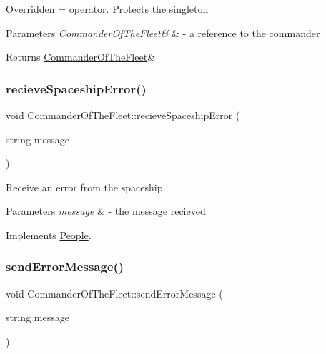 Overridden = operator. Protects the singleton 
\begin{DoxyParams}{Parameters}
{\em Commander\+Of\+The\+Fleet\&} & -\/ a reference to the commander \\
\hline
\end{DoxyParams}
\begin{DoxyReturn}{Returns}
\hyperlink{classCommanderOfTheFleet}{Commander\+Of\+The\+Fleet}\& 
\end{DoxyReturn}
\mbox{\label{classCommanderOfTheFleet_a13e91b9342df067b375f7ef2b929c0d5}} 
\subsubsection{\texorpdfstring{recieve\+Spaceship\+Error()}{recieveSpaceshipError()}}
{\footnotesize\ttfamily void Commander\+Of\+The\+Fleet\+::recieve\+Spaceship\+Error (\begin{DoxyParamCaption}\item[{string}]{message }\end{DoxyParamCaption})\hspace{0.3cm}{\ttfamily [virtual]}}

Receive an error from the spaceship 
\begin{DoxyParams}{Parameters}
{\em message} & -\/ the message recieved \\
\hline
\end{DoxyParams}


Implements \hyperlink{classPeople_a0685df78be631783138865e03cc7c85d}{People}.

\mbox{\label{classCommanderOfTheFleet_a39cfd5c0016355543515e919791d7984}} 
\subsubsection{\texorpdfstring{send\+Error\+Message()}{sendErrorMessage()}}
{\footnotesize\ttfamily void Commander\+Of\+The\+Fleet\+::send\+Error\+Message (\begin{DoxyParamCaption}\item[{string}]{message }\end{DoxyParamCaption})\hspace{0.3cm}{\ttfamily [virtual]}}

